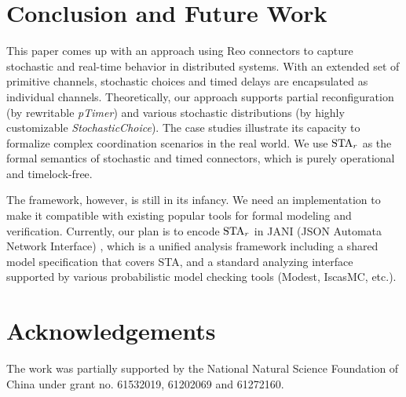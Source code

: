 \section{Conclusion and Future Work}
\label{sec:conclusion}

This paper comes up with an approach using Reo connectors to capture stochastic and real-time behavior in distributed systems. With an extended set of primitive channels, stochastic choices and timed delays are encapsulated as individual channels. Theoretically, our approach supports partial reconfiguration (by rewritable \emph{pTimer}) and various stochastic distributions (by highly customizable \emph{StochasticChoice}). The case studies illustrate its capacity to formalize complex coordination scenarios in the real world. We use $\mbox{STA}_r$ as the formal semantics of stochastic and timed connectors, which is purely operational and timelock-free.

The framework, however, is still in its infancy. We need an implementation to make it compatible with existing popular tools for formal modeling and verification. Currently, our plan is to encode $\mbox{STA}_r$ in JANI (JSON Automata Network Interface) \cite{JaniSpec}, which is a unified analysis framework including a shared model specification that covers STA, and a standard analyzing interface supported by various probabilistic model checking tools (Modest\cite{Hartmanns12}, IscasMC\cite{HahnYiFM14}, etc.).


\section*{Acknowledgements}
The work was partially supported by the National Natural Science Foundation of China under grant no. 61532019, 61202069 and 61272160.
